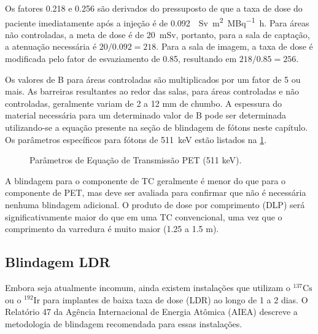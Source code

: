 \documentclass[11pt,a4paper]{article}
\begin{document}
	Os fatores 0.218 e 0.256 são derivados do pressuposto de que a taxa de dose do paciente imediatamente após a injeção é de \SI{0.092}{\mu\sievert\meter\squared\per\mega\becquerel\hour}. Para áreas não controladas, a meta de dose é de \SI{20}{\milli\sievert}, portanto, para a sala de captação, a atenuação necessária é ${20}/{0.092} = 218$. Para a sala de imagem, a taxa de dose é modificada pelo fator de esvaziamento de 0.85, resultando em ${218}/{0.85} = 256$.

	Os valores de B para áreas controladas são multiplicados por um fator de 5 ou mais. As barreiras resultantes ao redor das salas, para áreas controladas e não controladas, geralmente variam de 2 a 12 mm de chumbo. A espessura do material necessária para um determinado valor de B pode ser determinada utilizando-se a equação presente na seção de blindagem de fótons neste capítulo. Os parâmetros específicos para fótons de \SI{511}{\kilo\electronvolt} estão listados na \ref{fig:prTransPet}.

	\begin{figure}[!h]
		\centering
		\caption{Parâmetros de Equação de Transmissão PET (511 keV).}
		\label{fig:prTransPet}
	\end{figure}

	A blindagem para o componente de TC geralmente é menor do que para o componente de PET, mas deve ser avaliada para confirmar que não é necessária nenhuma blindagem adicional. O produto de dose por comprimento (DLP) será significativamente maior do que em uma TC convencional, uma vez que o comprimento da varredura é muito maior (1.25 a 1.5 m).

	

\subsection*{Blindagem LDR}
	
	Embora seja atualmente incomum, ainda existem instalações que utilizam o ${}^{137}\text{Cs}$ ou o ${}^{192}\text{Ir}$ para implantes de baixa taxa de dose (LDR) ao longo de 1 a 2 dias. O Relatório 47 da Agência Internacional de Energia Atômica (AIEA) descreve a metodologia de blindagem recomendada para essas instalações.
\end{document}
